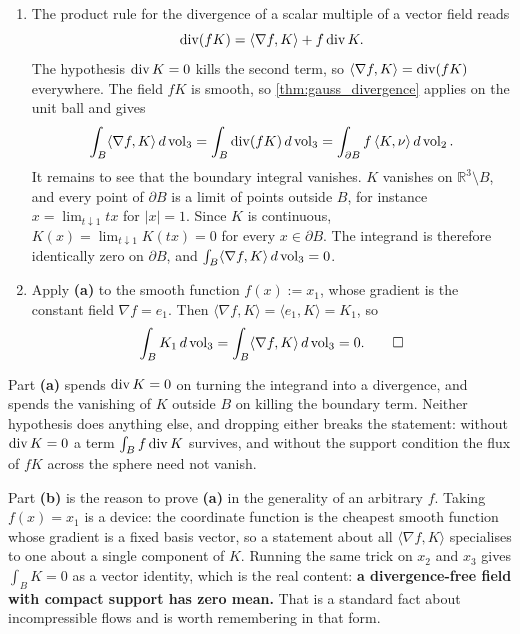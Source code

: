 \begin{exercisesolution}
\label{sol:knoerrer_divergence_free_compact_support}
\begin{enumerate}[label=\textbf{(\alph*)}]
  \item The product rule for the divergence of a scalar multiple of a vector field reads
    \[\operatorname{div}(fK) = \langle \nabla f, K\rangle + f \operatorname{div} K.\]
    The hypothesis $\operatorname{div} K = 0$ kills the second term, so $\langle\nabla f,K\rangle = \operatorname{div}(fK)$
    everywhere. The field $fK$ is smooth, so \cref{thm:gauss_divergence} applies on the unit ball
    and gives
    \[\int_B \langle\nabla f, K\rangle \,d\operatorname{vol}_3 = \int_B \operatorname{div}(fK)\,d\operatorname{vol}_3
      = \int_{\partial B} f\,\langle K,\nu\rangle \,d\operatorname{vol}_2 .\]
    It remains to see that the boundary integral vanishes. $K$ vanishes on
    $\mathbb{R}^3\setminus B$, and every point of $\partial B$ is a limit of points outside $B$,
    for instance $x = \lim_{t \downarrow 1} tx$ for $\lvert x\rvert = 1$. Since $K$ is continuous,
    $K(x) = \lim_{t\downarrow1}K(tx) = 0$ for every $x \in \partial B$. The integrand is therefore
    identically zero on $\partial B$, and
    $\int_B \langle\nabla f,K\rangle\,d\operatorname{vol}_3 = 0$.

  \item Apply \textbf{(a)} to the smooth function $f(x) := x_1$, whose gradient is the constant
    field $\nabla f = e_1$. Then $\langle\nabla f,K\rangle = \langle e_1,K\rangle = K_1$, so
    \[\int_B K_1 \,d\operatorname{vol}_3 = \int_B \langle\nabla f,K\rangle\,d\operatorname{vol}_3 = 0.\qedhere\]
\end{enumerate}
\begin{remark}
Part \textbf{(a)} spends $\operatorname{div} K = 0$ on turning the integrand into a divergence, and spends the
vanishing of $K$ outside $B$ on killing the boundary term. Neither hypothesis does anything else,
and dropping either breaks the statement: without $\operatorname{div} K = 0$ a term $\int_B f \operatorname{div} K$ survives,
and without the support condition the flux of $fK$ across the sphere need not vanish.

Part \textbf{(b)} is the reason to prove \textbf{(a)} in the generality of an arbitrary $f$. Taking
$f(x) = x_1$ is a device: the coordinate function is the cheapest smooth function whose gradient is
a fixed basis vector, so a statement about all $\langle\nabla f, K\rangle$ specialises to one about
a single component of $K$. Running the same trick on $x_2$ and $x_3$ gives $\int_B K = 0$ as a
vector identity, which is the real content: \textbf{a divergence-free field with compact support
has zero mean.} That is a standard fact about incompressible flows and is worth remembering in
that form.
\end{remark}
\end{exercisesolution}

